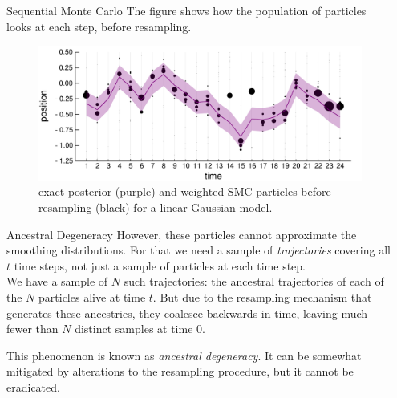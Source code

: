 \documentclass[final, 12pt]{beamer}
\newlength{\colwidth}
\begin{document}
\begin{frame}
\begin{columns}
\begin{column}{\colwidth}
\begin{block}{Sequential Monte Carlo}
The figure shows how the population of particles looks at each step, before resampling.
\begin{figure}
\includegraphics[width=\colwidth]{smc_kalman.pdf}
\caption{exact posterior (purple) and weighted SMC particles before resampling (black) for a linear Gaussian model.}
\end{figure}
\end{block}

\begin{block}{Ancestral Degeneracy}
However, these particles cannot approximate the smoothing distributions. For that we need a sample of \emph{trajectories} covering all $t$ time steps, not just a sample of particles at each time step.\\[10pt]

We have a sample of $N$ such trajectories: the ancestral trajectories of each of the $N$ particles alive at time $t$.
But due to the resampling mechanism that generates these ancestries, they coalesce backwards in time, leaving much fewer than $N$ distinct samples at time 0. 

\vspace{200pt}

This phenomenon is known as \emph{ancestral degeneracy}. It can be somewhat mitigated by alterations to the resampling procedure, but it cannot be eradicated.

\end{block}
\end{column}

\begin{column}{\colwidth}
\begin{block}

\end{block}
\end{column}
\end{columns}

\end{frame}
\end{document}
